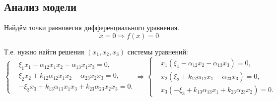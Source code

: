 \subsection{Анализ модели}
    Найдём точки равновесия дифференциального уравнения.
    \[
        \dot{x} = 0 \Rightarrow f(x) = 0
    \]

    Т.е. нужно найти решения \( (x_1, x_2, x_3) \) системы уравнений:
    \[
        \left\{\begin{split}
            & \xi_1 x_1 - \alpha_{12} x_1 x_2 - \alpha_{13} x_1 x_3 = 0, \\
            & \xi_2 x_2 + k_{12} \alpha_{12} x_1 x_2 - \alpha_{23} x_2 x_3 = 0, \\
            & -\xi_3 x_3 + k_{13} \alpha_{13} x_1 x_3 + k_{23} \alpha_{23} x_2 x_3 = 0. 
        \end{split}\right.
        \Rightarrow
        \left\{\begin{split}
            & x_1 (\xi_1 - \alpha_{12} x_2 - \alpha_{13} x_3) = 0, \\
            & x_2 (\xi_2 + k_{12} \alpha_{12} x_1 - \alpha_{23} x_3) = 0, \\
            & x_3 (-\xi_3 + k_{13} \alpha_{13} x_1 + k_{23} \alpha_{23} x_2) = 0. 
        \end{split}\right.
    \]

